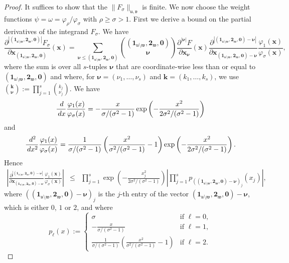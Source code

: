 \documentclass[10pt,a4paper]{amsart}
\newcommand{\bsk}{\boldsymbol{k}}
\newcommand{\bsnu}{\boldsymbol{\nu}}
\newcommand{\bsone}{\boldsymbol{1}}
\newcommand{\bstwo}{\boldsymbol{2}}
\newcommand{\bsx}{\boldsymbol{x}}
\newcommand{\bszero}{\boldsymbol{0}}
\newcommand{\rd}{\, {\rm d}}
\newcommand{\uu}{\mathfrak{u}}
\newcommand{\vv}{\mathfrak{v}}
\newcommand{\ww}{\mathfrak{w}}
\begin{document}
\begin{proof}
It suffices to show that the $\|F_\sigma\|_{\uu,\vv}$ is finite. We now choose the weight functions $\psi=\omega = \varphi_\rho / \varphi_\sigma$ with $\rho \ge \sigma > 1$. First we derive  a bound on the partial derivatives of the integrand $F_\sigma$. We have
$$\frac{\partial^{|(\bsone_{\uu \setminus \ww},\bstwo_{\ww},\bszero)|}F_{\sigma}}{\partial \bsx_{(\bsone_{\uu \setminus \ww},\bstwo_{\ww},\bszero)}} (\bsx) = \sum_{\bsnu \le (\bsone_{\uu \setminus \ww},\bstwo_{\ww},\bszero)} {(\bsone_{\uu \setminus \ww},\bstwo_{\ww},\bszero) \choose \bsnu} \frac{\partial^{|\bsnu|}F}{\partial \bsx_{\bsnu}}(\bsx) \frac{\partial^{|(\bsone_{\uu \setminus \ww},\bstwo_{\ww},\bszero) -\bsnu|}}{\partial \bsx_{(\bsone_{\uu \setminus \ww},\bstwo_{\ww},\bszero)-\bsnu}} \frac{\varphi_1(\bsx)}{\varphi_{\sigma}(\bsx)},$$
where the sum is over all $s$-tuples $\bsnu$ that are coordinate-wise less than or equal to $(\bsone_{\uu \setminus \ww},\bstwo_{\ww},\bszero)$ and where, for $\bsnu=(\nu_1,\ldots,\nu_s)$ and $\bsk=(k_1,\ldots,k_s)$, we use ${\bsk \choose \bsnu}:=\prod_{j=1}^s {k_j \choose \nu_j}$. We have $$\frac{\rd}{\rd x} \frac{\varphi_1(x)}{\varphi_{\sigma}(x)}=-\frac{x}{\sigma/(\sigma^2-1)} \exp\left(-\frac{x^2}{2 \sigma^2/(\sigma^2-1)}\right)$$ 
and 
$$\frac{\rd^2}{\rd x^2} \frac{\varphi_1(x)}{\varphi_{\sigma}(x)}=\frac{1}{\sigma/(\sigma^2-1)} \left(\frac{x^2}{\sigma^2/(\sigma^2-1)}-1\right) \exp\left(-\frac{x^2}{2 \sigma^2/(\sigma^2-1)}\right).$$ Hence
\begin{eqnarray*}
\left|\frac{\partial^{|(\bsone_{\uu \setminus \ww},\bstwo_{\ww},\bszero) -\bsnu|}}{\partial \bsx_{(\bsone_{\uu \setminus \ww},\bstwo_{\ww},\bszero)-\bsnu}} \frac{\varphi_1(\bsx)}{\varphi_{\sigma}(\bsx)}\right| & \le & \prod_{j = 1}^s \exp\left(-\frac{x_j^2}{2 \sigma^2/(\sigma^2-1)}\right) \left| \prod_{j=1}^s p_{((\bsone_{\uu \setminus \ww},\bstwo_{\ww},\bszero) -\bsnu)_j}(x_j)\right|,
\end{eqnarray*}
where $((\bsone_{\uu \setminus \ww},\bstwo_{\ww},\bszero) -\bsnu)_j$ is the $j$-th entry of the vector $(\bsone_{\uu \setminus \ww},\bstwo_{\ww},\bszero) -\bsnu$, which is either $0$, $1$ or $2$, and where
$$p_{\ell}(x) := \left\{ 
\begin{array}{ll}
\sigma & \mbox{if } \ell=0,\\
-\frac{x}{\sigma/(\sigma^2-1)} & \mbox{if } \ell=1,\\
\frac{1}{\sigma/(\sigma^2-1)} \left(\frac{x^2}{\sigma^2/(\sigma^2-1)}-1\right) & \mbox{if } \ell=2.
\end{array}\right. $$

\end{proof}
\end{document}
